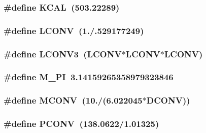 \subsubsection{\setlength{\rightskip}{0pt plus 5cm}\#define KCAL~(503.22289)}\label{md__numbers_8h_81e9573b67e81c8fa6a25cef4a2891ca}


\subsubsection{\setlength{\rightskip}{0pt plus 5cm}\#define LCONV~(1./.529177249)}\label{md__numbers_8h_ca696a40d766ca5d59c2bbbfd73409c2}


\subsubsection{\setlength{\rightskip}{0pt plus 5cm}\#define LCONV3~(LCONV$\ast$LCONV$\ast$LCONV)}\label{md__numbers_8h_4311862469e282fb0245c63d296a314c}


\subsubsection{\setlength{\rightskip}{0pt plus 5cm}\#define M\_\-PI~3.14159265358979323846}\label{md__numbers_8h_e71449b1cc6e6250b91f539153a7a0d3}


\subsubsection{\setlength{\rightskip}{0pt plus 5cm}\#define MCONV~(10./(6.022045$\ast$DCONV))}\label{md__numbers_8h_eed3ba86796a7ed39d47ea5b24128ad0}


\subsubsection{\setlength{\rightskip}{0pt plus 5cm}\#define PCONV~(138.0622/1.01325)}\label{md__numbers_8h_570d7ed4120a6aa238e471491d8cc825}


